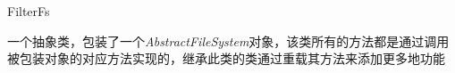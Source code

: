 \begin{XeClass}{FilterFs}
   
 一个抽象类，包装了一个\emph{AbstractFileSystem}对象，该类所有的方法都是通过调用
 被包装对象的对应方法实现的，继承此类的类通过重载其方法来添加更多地功能

\end{XeClass}
